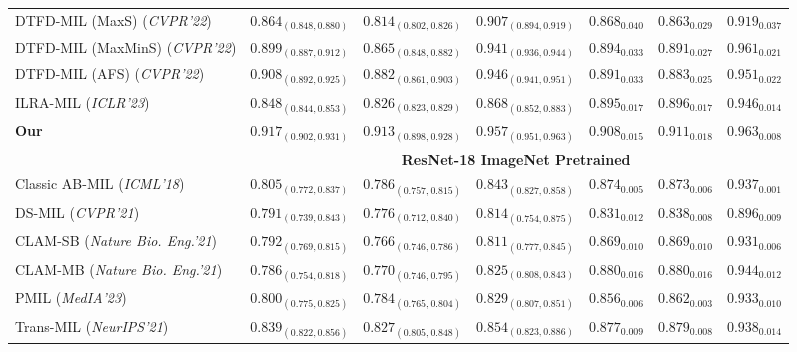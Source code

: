 \documentclass[runningheads]{llncs}
\begin{document}
\begin{table}[t]
{\begin{tabular}{lccc|ccc}
                    DTFD-MIL (MaxS) (\textit{CVPR'22})  &$0.864_{(0.848,0.880)} $& $0.814_{(0.802,0.826)}$& $0.907_{(0.894,0.919)} $&$ 0.868_{0.040 }$& $0.863_{0.029}$& $0.919_{0.037}$
                    \\ %
                    DTFD-MIL (MaxMinS) (\textit{CVPR'22})  &$0.899_{(0.887,0.912)}$ & $0.865_{(0.848,0.882)}$ & $0.941_{(0.936,0.944)}$ & $0.894_{0.033}$ & $0.891_{0.027}$ & $0.961_{0.021}$ \\ %
                    DTFD-MIL (AFS) (\textit{CVPR'22})  & $0.908_{(0.892,0.925)}$ & $0.882_{(0.861,0.903)}$ & $0.946_{(0.941,0.951)}$ & $0.891_{0.033}$ & $0.883_{0.025}$ & $0.951_{0.022}$
                    \\%
                    ILRA-MIL (\textit{ICLR'23}) 
                    &$0.848_{(0.844,0.853)}$& $0.826_{(0.823,0.829)}$ & $0.868_{(0.852,0.883)} $  & $0.895_{0.017}$ &$0.896_{0.017}$ &$0.946_{0.014}$  
                      \\                 
                     \rowcolor{blue!8} 
                     \textbf{Our}  
&$\mathbf{0.917}_{(0.902, 0.931)}$& $\mathbf{0.913}_{(0.898, 0.928)}$ & $\mathbf{0.957}_{(0.951, 0.963)}$ & $\mathbf{0.908}_{0.015}$&$\mathbf{0.911}_{0.018}$&$\mathbf{0.963}_{0.008}$

\\ 
                     
                 \hline
                    & \multicolumn{6}{c}{\cellcolor{blue!20}\bf ResNet-18 ImageNet Pretrained} \\
                    Classic AB-MIL (\textit{ICML'18})  & $0.805_{(0.772,0.837)}$& $0.786_{(0.757,0.815)}$ & $0.843_{(0.827,0.858)}$ &$0.874_{0.005}$ & $0.873_{0.006}$ & $0.937_{0.001}$\\ %
   
                    DS-MIL (\textit{CVPR'21})  &$0.791_{(0.739,0.843)}$  &$0.776_{(0.712,0.840)}$  &$0.814_{(0.754,0.875)}$  &$0.831_{0.012}$ & $0.838_{0.008}$ &$0.896_{0.009}$\\ %
                    CLAM-SB (\textit{Nature Bio. Eng.'21})  & $0.792_{(0.769,0.815)}$ & $0.766_{(0.746,0.786)}$ & $0.811_{(0.777,0.845)}$ & $0.869_{0.010}$ & $0.869_{0.010}$ & $0.931_{0.006}$\\ %
                    CLAM-MB (\textit{Nature Bio. Eng.'21}) &$0.786_{(0.754,0.818)}$ & $0.770_{(0.746,0.795)}$& $0.825_{(0.808,0.843)} $& $0.880_{0.016} $& $0.880_{0.016}$ & $0.944_{0.012}$\\ %
                    PMIL (\textit{MedIA'23})  &$0.800_{(0.775,0.825)}$& $0.784_{(0.765,0.804)}$ & $0.829_{(0.807,0.851)} $ 
                     & $0.856_{0.006}$ &$0.862_{0.003}$ &$0.933_{0.010}$\\%
                    Trans-MIL (\textit{NeurIPS'21}) & $0.839_{(0.822,0.856)}$  & $0.827_{(0.805,0.848)}$  & $0.854_{(0.823,0.886)}$ & $0.877_{0.009}$  & $0.879_{0.008}$  & $0.938_{0.014}$ \\ %
                    

\end{tabular}}
\end{table}
\end{document}
